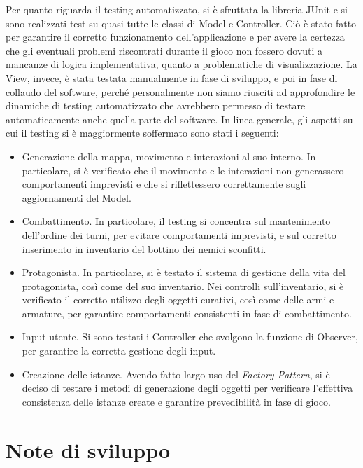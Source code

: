 \documentclass[a4paper,12pt]{report}
\begin{document}
Per quanto riguarda il testing automatizzato, si è sfruttata la libreria JUnit e si sono realizzati test su quasi tutte le classi di Model e Controller. Ciò è stato fatto per garantire il corretto funzionamento dell’applicazione e per avere la certezza che gli eventuali problemi riscontrati durante il gioco non fossero dovuti a mancanze di logica implementativa, quanto a problematiche di visualizzazione. 
%
\newline La View, invece, è stata testata manualmente in fase di sviluppo, e poi in fase di collaudo del software, perché personalmente non siamo riusciti ad approfondire le dinamiche di testing automatizzato che avrebbero permesso di testare automaticamente anche quella parte del software.
%
\newline In linea generale, gli aspetti su cui il testing si è maggiormente soffermato sono stati i seguenti:

\begin{itemize}
	\item Generazione della mappa, movimento e interazioni al suo interno. In particolare, si è verificato che il movimento e le interazioni non generassero comportamenti imprevisti e che si riflettessero correttamente sugli aggiornamenti del Model.
	\item Combattimento. In particolare, il testing si concentra sul mantenimento dell’ordine dei turni, per evitare comportamenti imprevisti, e sul corretto inserimento in inventario del bottino dei nemici sconfitti.
	\item Protagonista. In particolare, si è testato il sistema di gestione della vita del protagonista, così come del suo inventario. Nei controlli sull’inventario, si è verificato il corretto utilizzo degli oggetti curativi, così come delle armi e armature, per garantire comportamenti consistenti in fase di combattimento.
	\item Input utente. Si sono testati i Controller che svolgono la funzione di Observer, per garantire la corretta gestione degli input.
	\item Creazione delle istanze. Avendo fatto largo uso del \textit{Factory Pattern}, si è deciso di testare i metodi di generazione degli oggetti per verificare l’effettiva consistenza delle istanze create e garantire prevedibilità in fase di gioco.
\end{itemize}

\section{Note di sviluppo}
\end{document}
